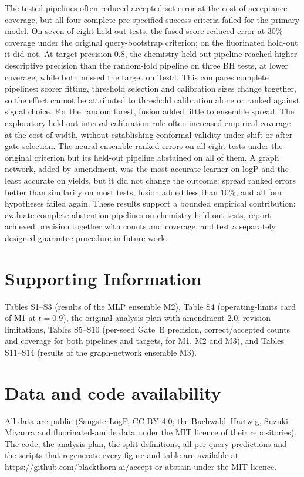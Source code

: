 \documentclass[11pt,letterpaper]{article}
\begin{document}
The tested pipelines often reduced accepted-set error at the cost of acceptance coverage, but all four complete pre-specified success criteria failed for the primary model. On seven of eight held-out tests, the fused score reduced error at 30\% coverage under the original query-bootstrap criterion; on the fluorinated hold-out it did not. At target precision 0.8, the chemistry-held-out pipeline reached higher descriptive precision than the random-fold pipeline on three BH tests, at lower coverage, while both missed the target on Test4. This compares complete pipelines: scorer fitting, threshold selection and calibration sizes change together, so the effect cannot be attributed to threshold calibration alone or ranked against signal choice. For the random forest, fusion added little to ensemble spread. The exploratory held-out interval-calibration rule often increased empirical coverage at the cost of width, without establishing conformal validity under shift or after gate selection. The neural ensemble ranked errors on all eight tests under the original criterion but its held-out pipeline abstained on all of them. A graph network, added by amendment, was the most accurate learner on logP and the least accurate on yields, but it did not change the outcome: spread ranked errors better than similarity on most tests, fusion added less than 10\%, and all four hypotheses failed again. These results support a bounded empirical contribution: evaluate complete abstention pipelines on chemistry-held-out tests, report achieved precision together with counts and coverage, and test a separately designed guarantee procedure in future work.

\section*{Supporting Information}
Tables S1--S3 (results of the MLP ensemble M2), Table S4 (operating-limits card of M1 at $t = 0.9$), the original analysis plan with amendment 2.0, revision limitations, Tables S5--S10 (per-seed Gate~B precision, correct/accepted counts and coverage for both pipelines and targets, for M1, M2 and M3), and Tables S11--S14 (results of the graph-network ensemble M3).

\section*{Data and code availability}
All data are public (SangsterLogP, CC BY 4.0;\cite{sangsterzenodo} the Buchwald--Hartwig, Suzuki--Miyaura and fluorinated-amide data under the MIT licence of their repositories). The code, the analysis plan, the split definitions, all per-query predictions and the scripts that regenerate every figure and table are available at \url{https://github.com/blackthorn-ai/accept-or-abstain} under the MIT licence.
\end{document}
